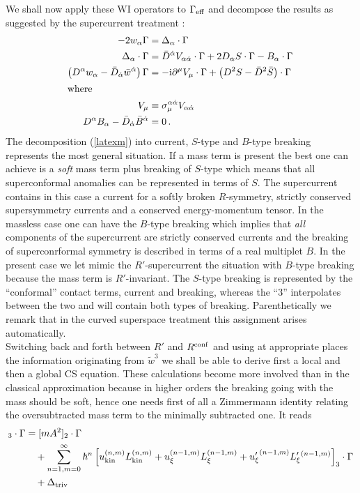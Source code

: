 \documentclass[a4paper,12pt]{article}
\newcommand{\I}{{\rm i}}
\def\pr{\partial}
\newcommand{\Geff}{\Gamma_{\rm eff}}
\newcommand{\Lkin}{L_{\rm kin}}
\newcommand{\Lxi}{L_{\xi}}
\newcommand{\Lxib}{L_{\xi}'{}}
\newcommand{\ukin}{u_{\rm kin}}
\newcommand{\uxi}{u_{\xi}}
\newcommand{\uxib}{{u_{\xi}'}}
\newcommand{\al}{\alpha}
\newcommand{\da}{{\dot\alpha}}
\begin{document}
We shall now apply these WI operators to $\Geff$ and decompose the results
as suggested by the supercurrent treatment \cite{CPS, PSbook}:
\begin{align}
-2 w_\al \Gamma &= \Delta_\al \cdot \Gamma \\
\Delta_\al \cdot  \Gamma &= \bar D^\da V_{\al\da} \cdot \Gamma + 2 D_\al S
\cdot \Gamma - B_\al \cdot \Gamma \, \label{latexm}\\
\left( D^\al w_\al - \bar D_\da \bar w^\da \right) \Gamma &= -\I \pr^\mu
V_\mu \cdot \Gamma + \left( D^2 S - \bar D^2 \bar S \right) \cdot \Gamma \\
\intertext{where}
V_\mu &\equiv \sigma_\mu^{\al\da} V_{\al\da}\\
D^\al B_\al - \bar D_\da \bar B^\da &= 0\,.
\end{align}
The decomposition (\ref{latexm}) into current, $S$-type and $B$-type breaking
represents the most general situation. If a mass term is present the best
one can achieve is a {\sl soft} mass term plus breaking of $S$-type which
means that all superconformal anomalies can be represented in terms of $S$.
The supercurrent contains in this case a current for a softly broken
$R$-symmetry, strictly conserved supersymmetry currents and a conserved
energy-momentum tensor. In the massless case one can have the $B$-type
breaking which implies that {\sl all} components of the supercurrent are
strictly conserved currents and the breaking of superconrformal symmetry is 
described in terms of a real multiplet $B$. In the present case we
let mimic the $R'$-supercurrent the situation with $B$-type breaking
because the mass term is $R'$-invariant. The $S$-type breaking is
represented by the ``conformal'' contact terms, current and breaking,
whereas the ``3'' interpolates between the two and will contain both
types of breaking. Parenthetically we remark that in the curved superspace
treatment this assignment arises automatically.\\
Switching back and forth between $R'$ and $R^{\rm conf}$ and using at
appropriate places the information originating from $\tilde w^3$ we shall
be able to derive first a local and then a global CS equation. 
These calculations become more involved than in the classical approximation
because in higher orders the breaking going with the mass should be soft,
hence one needs first of all a Zimmermann identity relating the
oversubtracted mass term to the minimally subtracted one. It reads
\begin{align}
[m A^2]_3\cdot\Gamma &= [m A^2]_2\cdot\Gamma
\nonumber \\
& \quad + \sum_{n=1,m=0}^\infty \hbar^n \left[ \ukin^{(n,m)} \Lkin^{(n,m)} +
    \uxi^{(n-1,m)} \Lxi^{(n-1,m)} + \uxib^{(n-1,m)} \Lxib^{(n-1,m)}
  \right]_3\cdot\Gamma \nonumber\\
& \quad + \Delta_{\rm triv} \label{Zimmermann}
\end{align}
\end{document}

